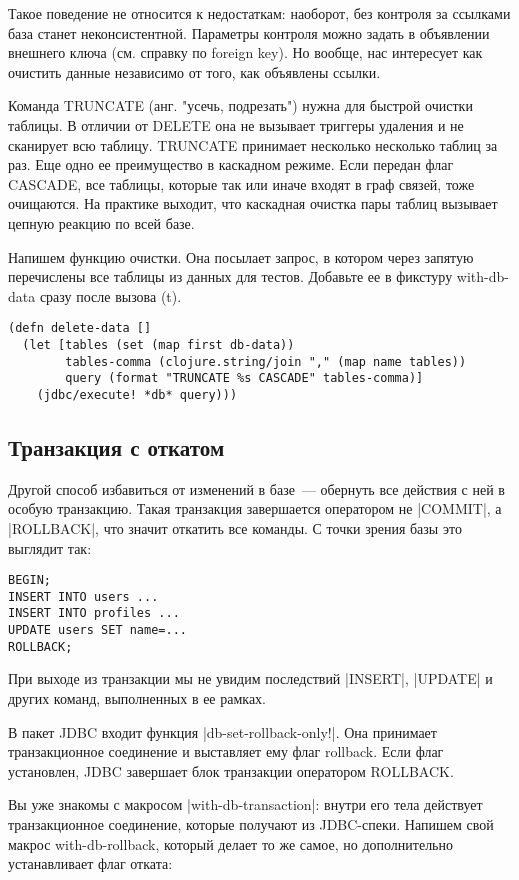 Такое поведение не относится к недостаткам: наоборот, без контроля за ссылками
база станет неконсистентной. Параметры контроля можно задать в объявлении
внешнего ключа (см. справку по foreign key). Но вообще, нас интересует как
очистить данные независимо от того, как объявлены ссылки.

Команда TRUNCATE (анг. "усечь, подрезать") нужна для быстрой очистки таблицы. В
отличии от DELETE она не вызывает триггеры удаления и не сканирует всю
таблицу. TRUNCATE принимает несколько несколько таблиц за раз. Еще одно ее
преимущество в каскадном режиме. Если передан флаг CASCADE, все таблицы, которые
так или иначе входят в граф связей, тоже очищаются. На практике выходит, что
каскадная очистка пары таблиц вызывает цепную реакцию по всей базе.

Напишем функцию очистки. Она посылает запрос, в котором через запятую
перечислены все таблицы из данных для тестов. Добавьте ее в фикстуру
with-db-data сразу после вызова (t).

\begin{verbatim}
(defn delete-data []
  (let [tables (set (map first db-data))
        tables-comma (clojure.string/join "," (map name tables))
        query (format "TRUNCATE %s CASCADE" tables-comma)]
    (jdbc/execute! *db* query)))
\end{verbatim}

\subsection{Транзакция с откатом}

Другой способ избавиться от изменений в базе~--- обернуть все действия с ней в
особую транзакцию. Такая транзакция завершается оператором не \spverb|COMMIT|, а
\spverb|ROLLBACK|, что значит откатить все команды. С точки зрения базы это выглядит
так:

\begin{verbatim}
BEGIN;
INSERT INTO users ...
INSERT INTO profiles ...
UPDATE users SET name=...
ROLLBACK;
\end{verbatim}

При выходе из транзакции мы не увидим последствий \spverb|INSERT|, \spverb|UPDATE| и других
команд, выполненных в ее рамках.

В пакет JDBC входит функция \spverb|db-set-rollback-only!|. Она принимает
транзакционное соединение и выставляет ему флаг rollback. Если флаг установлен,
JDBC завершает блок транзакции оператором ROLLBACK.

Вы уже знакомы с макросом \spverb|with-db-transaction|: внутри его тела действует
транзакционное соединение, которые получают из JDBC-спеки. Напишем свой макрос
with-db-rollback, который делает то же самое, но дополнительно устанавливает
флаг отката:

